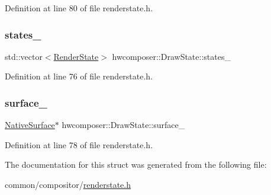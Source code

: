 Definition at line 80 of file renderstate.\+h.

\mbox{\label{structhwcomposer_1_1DrawState_ae756fae051e787e29f88e99817e47d9e}} 
\subsubsection{\texorpdfstring{states\+\_\+}{states\_}}
{\footnotesize\ttfamily std\+::vector$<$\mbox{\hyperlink{structhwcomposer_1_1RenderState}{Render\+State}}$>$ hwcomposer\+::\+Draw\+State\+::states\+\_\+}



Definition at line 76 of file renderstate.\+h.

\mbox{\label{structhwcomposer_1_1DrawState_a4d54482d23b17eb7da0dab3be1fa2e52}} 
\subsubsection{\texorpdfstring{surface\+\_\+}{surface\_}}
{\footnotesize\ttfamily \mbox{\hyperlink{classhwcomposer_1_1NativeSurface}{Native\+Surface}}$\ast$ hwcomposer\+::\+Draw\+State\+::surface\+\_\+}



Definition at line 78 of file renderstate.\+h.



The documentation for this struct was generated from the following file\+:\begin{DoxyCompactItemize}
\item 
common/compositor/\mbox{\hyperlink{renderstate_8h}{renderstate.\+h}}\end{DoxyCompactItemize}
